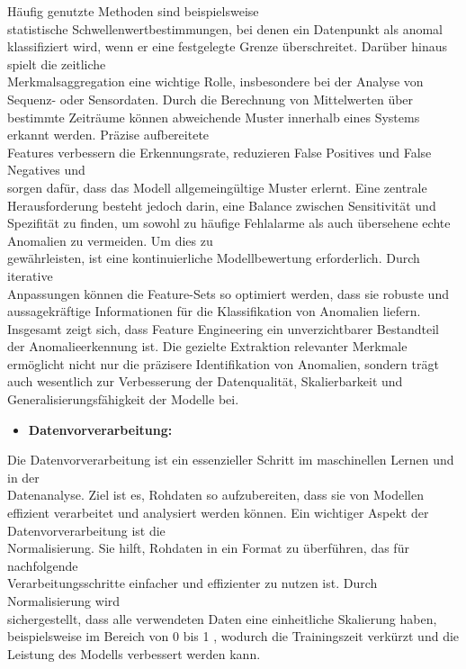 Häufig genutzte Methoden sind beispielsweise \\ statistische Schwellenwertbestimmungen, bei denen ein Datenpunkt als anomal klassifiziert wird, wenn er eine festgelegte Grenze überschreitet. Darüber hinaus spielt die zeitliche \\ Merkmalsaggregation eine wichtige Rolle, insbesondere bei der Analyse von \\ Sequenz- oder Sensordaten. Durch die Berechnung von Mittelwerten über bestimmte Zeiträume können abweichende Muster innerhalb eines Systems erkannt werden. Präzise aufbereitete \\ Features verbessern die Erkennungsrate, reduzieren False Positives und False Negatives und \\ sorgen dafür, dass das Modell allgemeingültige Muster erlernt. Eine zentrale Herausforderung besteht jedoch darin, eine Balance zwischen Sensitivität und Spezifität zu finden, um sowohl zu häufige Fehlalarme als auch übersehene echte Anomalien zu vermeiden. Um dies zu \\ gewährleisten, ist eine kontinuierliche Modellbewertung erforderlich. Durch iterative \\ Anpassungen können die Feature-Sets so optimiert werden, dass sie robuste und aussagekräftige Informationen für die Klassifikation von Anomalien liefern. Insgesamt zeigt sich, dass Feature Engineering ein unverzichtbarer Bestandteil der Anomalieerkennung ist. Die gezielte Extraktion relevanter Merkmale ermöglicht nicht nur die präzisere Identifikation von Anomalien, sondern trägt auch wesentlich zur Verbesserung der Datenqualität, Skalierbarkeit und  \\Generalisierungsfähigkeit der Modelle bei.
\nAbsatz
\begin{itemize} \item \textbf{Datenvorverarbeitung:} \end{itemize}
Die Datenvorverarbeitung ist ein essenzieller Schritt im maschinellen Lernen und in der \\ Datenanalyse. Ziel ist es, Rohdaten so aufzubereiten, dass sie von Modellen effizient verarbeitet und analysiert werden können.
Ein wichtiger Aspekt der Datenvorverarbeitung ist die \\Normalisierung. Sie hilft, Rohdaten in ein Format zu überführen, das für nachfolgende \\ Verarbeitungsschritte einfacher und effizienter zu nutzen ist. Durch Normalisierung wird \\ sichergestellt, dass alle verwendeten Daten eine einheitliche Skalierung haben, beispielsweise im Bereich von 0 bis 1 , wodurch die Trainingszeit verkürzt und die Leistung des Modells verbessert werden kann.
